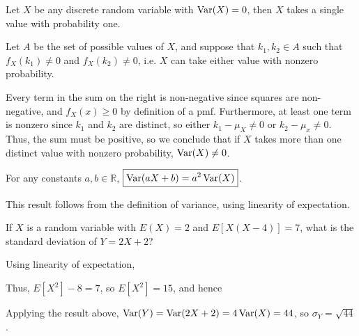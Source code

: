 \begin{prop}Let $X$ be any discrete random variable with $\operatorname{Var}(X) = 0$, then $X$ takes a single value with probability one.
\end{prop}

\begin{pf} Let $A$ be the set of possible values of $X$, and suppose that $k_1, k_2 \in A$ such that $f_X(k_1) \neq 0$ and $f_X (k_2) \neq 0$, i.e. $X$ can take either value with nonzero probability.
\par
\noindent Every term in the sum on the right is non-negative since squares are non-negative, and $f_X(x) \geq 0$ by definition of a pmf. Furthermore, at least one term is nonzero since $k_1$ and $k_2$ are distinct, so either $k_1  - \mu_X \neq 0$ or $k_2 - \mu_x \neq 0$. Thus, the sum must be positive, so we conclude that if $X$ takes more than one distinct value with nonzero probability, $\operatorname{Var}(X) \neq 0$.
\end{pf}

\begin{thm}\label{VarianceLinearity} For any constants $a, b \in \mathbb{R}$, $\boxed{\operatorname{Var}(aX+b) = a^2\operatorname{Var}(X)}$.
\end{thm}
\begin{pf} This result follows from the definition of variance, using linearity of expectation.
\end{pf}

\begin{examp} If $X$ is a random variable with $E(X) = 2$ and $E[X(X-4)]=7$, what is the standard deviation of $Y = 2X+2$?
\par
\noindent Using linearity of expectation,
\par
\noindent Thus, $E[X^2] - 8 = 7$, so $E[X^2] = 15$, and hence 
\par
\noindent Applying the result above, $\operatorname{Var}(Y) = \operatorname{Var}(2X+2) = 4\operatorname{Var}(X) = 44$, so $\sigma_Y = \sqrt{44}$.
\end{examp}

